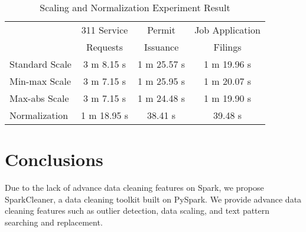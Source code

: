 \documentclass[sigconf]{acmart}
\begin{document}
\begin{table}
\caption{Scaling and Normalization Experiment Result}   
\label{tab:Scaling and Normalization Experiment Result}
\begin{tabular}{lccc}   
 	                      &  311 Service  &  Permit    &  Job Application \\ &Requests&Issuance&Filings   \\  
\hline
Standard Scale   & 3 m 8.15 s     & 1 m 25.57 s & 1 m 19.96 s            \\ 
Min-max Scale  &  3 m 7.15 s   & 1 m 25.95 s  & 1 m 20.07 s             \\  
Max-abs Scale  & 3 m 7.15 s     &  1 m 24.48 s  & 1 m 19.90 s             \\ 
Normalization    & 1 m 18.95 s     &  38.41 s & 39.48 s             \\ 

\end{tabular}   
\end{table}

\section{Conclusions}
Due to the lack of advance data cleaning features on Spark, we propose SparkCleaner, a data cleaning toolkit built on PySpark. We provide advance data cleaning features such as outlier detection, data scaling, and text pattern searching and replacement.



\end{document}
